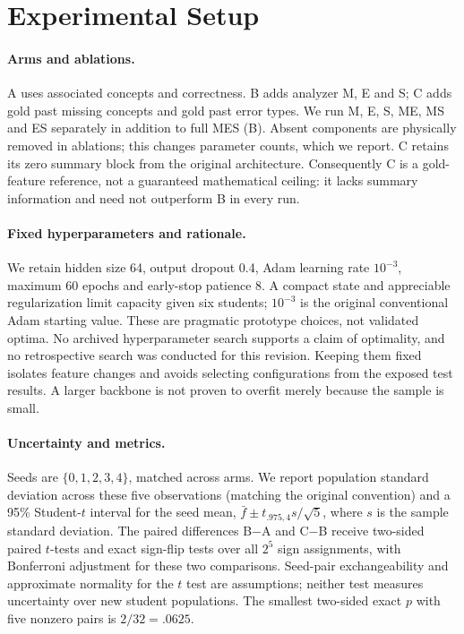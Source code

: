 \documentclass[11pt]{article}
\begin{document}
\section{Experimental Setup}
\paragraph{Arms and ablations.}
A uses associated concepts and correctness. B adds analyzer M, E and S; C adds gold past missing concepts and gold past error types. We run M, E, S, ME, MS and ES separately in addition to full MES (B). Absent components are physically removed in ablations; this changes parameter counts, which we report. C retains its zero summary block from the original architecture. Consequently C is a gold-feature reference, not a guaranteed mathematical ceiling: it lacks summary information and need not outperform B in every run.

\paragraph{Fixed hyperparameters and rationale.}
We retain hidden size 64, output dropout 0.4, Adam learning rate $10^{-3}$, maximum 60 epochs and early-stop patience 8. A compact state and appreciable regularization limit capacity given six students; $10^{-3}$ is the original conventional Adam starting value. These are pragmatic prototype choices, not validated optima. No archived hyperparameter search supports a claim of optimality, and no retrospective search was conducted for this revision. Keeping them fixed isolates feature changes and avoids selecting configurations from the exposed test results. A larger backbone is not proven to overfit merely because the sample is small.

\paragraph{Uncertainty and metrics.}
Seeds are $\{0,1,2,3,4\}$, matched across arms. We report population standard deviation across these five observations (matching the original convention) and a 95\% Student-$t$ interval for the seed mean, $\bar f\pm t_{.975,4}s/\sqrt5$, where $s$ is the sample standard deviation. The paired differences B$-$A and C$-$B receive two-sided paired $t$-tests and exact sign-flip tests over all $2^5$ sign assignments, with Bonferroni adjustment for these two comparisons. Seed-pair exchangeability and approximate normality for the $t$ test are assumptions; neither test measures uncertainty over new student populations. The smallest two-sided exact $p$ with five nonzero pairs is $2/32=.0625$.
\end{document}
